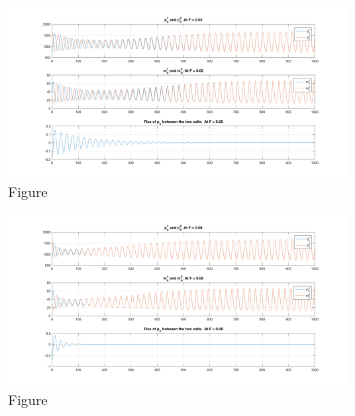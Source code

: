 \documentclass[12pt]{article}
\renewcommand{\(}{\left (}
\renewcommand{\)}{\right )}
\begin{document}
\begin{figure}[ht]
    \centering
	\begin{minipage}{0.99\textwidth}
		\centering
		\includegraphics[width=0.8\textwidth]{two_cell_same_period_diff_states_F02.png}
		\caption*{\small Figure}
	\end{minipage}
\end{figure}
\begin{figure}[ht]
    \centering
	\begin{minipage}{0.99\textwidth}
		\centering
		\includegraphics[width=0.8\textwidth]{two_cell_same_period_diff_states_F08.png}
		\caption*{\small Figure}
	\end{minipage}
\end{figure}
\end{document}
